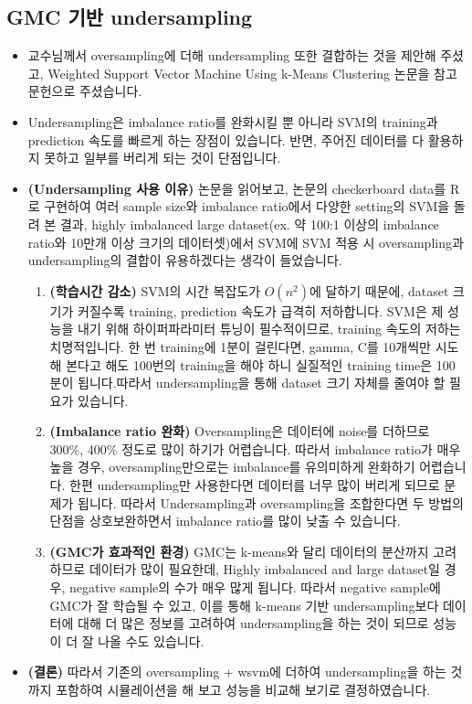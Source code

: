 \documentclass[a4papaer, 11pt]{article}
\begin{document}
\subsection{GMC 기반 undersampling}
\begin{itemize}
	\item 교수님께서 oversampling에 더해 undersampling 또한 결합하는 것을 제안해 주셨고, Weighted Support Vector Machine Using k-Means Clustering 논문을 참고문헌으로 주셨습니다.
	\item Undersampling은 imbalance ratio를 완화시킬 뿐 아니라 SVM의 training과 prediction 속도를 빠르게 하는 장점이 있습니다. 반면, 주어진 데이터를 다 활용하지 못하고 일부를 버리게 되는 것이 단점입니다.
	\item \textbf{(Undersampling 사용 이유)} 논문을 읽어보고, 논문의 checkerboard data를 R로 구현하여 여러 sample size와 imbalance ratio에서 다양한 setting의 SVM을 돌려 본 결과, highly imbalanced large dataset(ex. 약 100:1 이상의 imbalance ratio와 10만개 이상 크기의 데이터셋)에서 SVM에 SVM 적용 시 oversampling과 undersampling의 결합이 유용하겠다는 생각이 들었습니다.
	\begin{enumerate}
		\item \textbf{(학습시간 감소)} SVM의 시간 복잡도가 $O(n^2)$에 달하기 때문에, 	dataset 크기가 커질수록 training, prediction 속도가 급격히 저하합니다. SVM은 제 성능을 내기 위해 하이퍼파라미터 튜닝이 필수적이므로, training 속도의 저하는 치명적입니다. 한 번 training에 1분이 걸린다면, gamma, C를 10개씩만 시도해 본다고 해도 100번의 training을 해야 하니 실질적인 training time은 100분이 됩니다.따라서 undersampling을 통해 dataset 크기 자체를 줄여야 할 필요가 있습니다.
		\item \textbf{(Imbalance ratio 완화)} Oversampling은 데이터에 noise를 더하므로 300\%, 400\% 정도로 많이 하기가 어렵습니다. 따라서 imbalance ratio가 매우 높을 경우, oversampling만으로는 imbalance를 유의미하게 완화하기 어렵습니다. 한편 undersampling만 사용한다면 데이터를 너무 많이 버리게 되므로 문제가 됩니다. 따라서 Undersampling과 oversampling을 조합한다면 두 방법의 단점을 상호보완하면서 imbalance ratio를 많이 낮출 수 있습니다.
		\item \textbf{(GMC가 효과적인 환경)} GMC는 k-means와 달리 데이터의 분산까지 고려하므로 데이터가 많이 필요한데, Highly imbalanced and large dataset일 경우, negative sample의 수가 매우 많게 됩니다. 따라서 negative sample에 GMC가  잘 학습될 수 있고, 이를 통해 k-means 기반 undersampling보다 데이터에 대해 더 많은 정보를 고려하여 undersampling을 하는 것이 되므로 성능이 더 잘 나올 수도 있습니다.
	\end{enumerate}
	
	\item \textbf{(결론)} 따라서 기존의 oversampling + wsvm에 더하여 undersampling을 하는 것까지 포함하여 시뮬레이션을 해 보고 성능을 비교해 보기로 결정하였습니다.
	
\end{itemize}	
\end{document}
